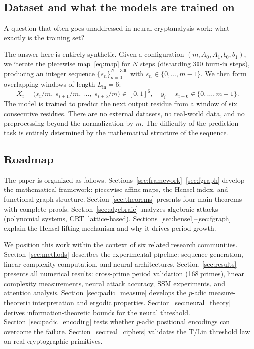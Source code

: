 \documentclass[11pt]{article}
\theoremstyle{plain}
\theoremstyle{definition}
\begin{document}
\subsection{Dataset and what the models are trained on}

A question that often goes unaddressed in neural cryptanalysis work: what exactly is the training set?

The answer here is entirely synthetic. Given a configuration $(m, A_0, A_1, b_0, b_1)$, we iterate the piecewise map~\eqref{eq:map} for $N$ steps (discarding 300 burn-in steps), producing an integer sequence $\{s_n\}_{n=0}^{N-300}$ with $s_n \in \{0,\ldots,m-1\}$. We then form overlapping windows of length $L_{\mathrm{in}} = 6$:
\[
  X_i = \bigl(s_i/m,\; s_{i+1}/m,\; \ldots,\; s_{i+5}/m\bigr) \in [0,1]^6,\quad y_i = s_{i+6} \in \{0,\ldots,m-1\}.
\]
The model is trained to predict the next output residue from a window of six consecutive residues. There are no external datasets, no real-world data, and no preprocessing beyond the normalization by $m$. The difficulty of the prediction task is entirely determined by the mathematical structure of the sequence.

\subsection{Roadmap}

The paper is organized as follows. Sections~\ref{sec:framework}--\ref{sec:fgraph} develop the mathematical framework: piecewise affine maps, the Hensel index, and functional graph structure. Section~\ref{sec:theorems} presents four main theorems with complete proofs. Section~\ref{sec:algebraic} analyzes algebraic attacks (polynomial systems, CRT, lattice-based). Sections~\ref{sec:hensel}--\ref{sec:fgraph} explain the Hensel lifting mechanism and why it drives period growth.

We position this work within the context of six related research communities. Section~\ref{sec:methods} describes the experimental pipeline: sequence generation, linear complexity computation, and neural architectures. Section~\ref{sec:results} presents all numerical results: cross-prime period validation (168 primes), linear complexity measurements, neural attack accuracy, SSM experiments, and attention analysis. Section~\ref{sec:padic_measure} develops the $p$-adic measure-theoretic interpretation and ergodic properties. Section~\ref{sec:neural_theory} derives information-theoretic bounds for the neural threshold. Section~\ref{sec:padic_encoding} tests whether $p$-adic positional encodings can overcome the failure. Section~\ref{sec:real_ciphers} validates the T/Lin threshold law on real cryptographic primitives.
\end{document}
